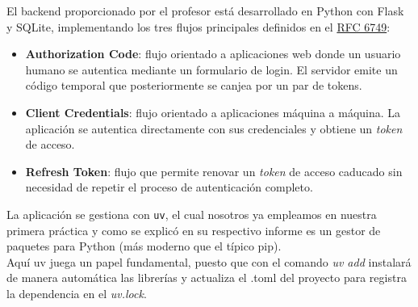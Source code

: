\documentclass[12pt, a4paper]{article}
\begin{document}
	El backend proporcionado por el profesor está desarrollado en Python con Flask y SQLite, implementando los tres flujos principales definidos en el \hyperlink{https://www.rfc-editor.org/rfc/rfc6749.html}{RFC 6749}:
	\begin{itemize}
		\item \textbf{Authorization Code}: flujo orientado a aplicaciones web donde un usuario humano se autentica mediante un formulario de login. El servidor emite un código temporal que posteriormente se canjea por un par de tokens.
		\item \textbf{Client Credentials}: flujo orientado a aplicaciones máquina a máquina. La aplicación se autentica directamente con sus credenciales y obtiene un \textit{token} de acceso.
		\item \textbf{Refresh Token}: flujo que permite renovar un \textit{token} de acceso caducado sin necesidad de repetir el proceso de autenticación completo.
	\end{itemize}
	
	La aplicación se gestiona con \texttt{uv}, el cual nosotros ya empleamos en nuestra primera práctica y como se explicó en su  respectivo informe es un gestor de paquetes para Python (más moderno que el típico pip).\\
	Aquí uv juega un papel fundamental, puesto que con el comando  \textit{uv add} instalará de manera automática las librerías y actualiza el .toml del proyecto para registra la dependencia en el \textit{uv.lock}. \\
	
	\newpage
\end{document}

